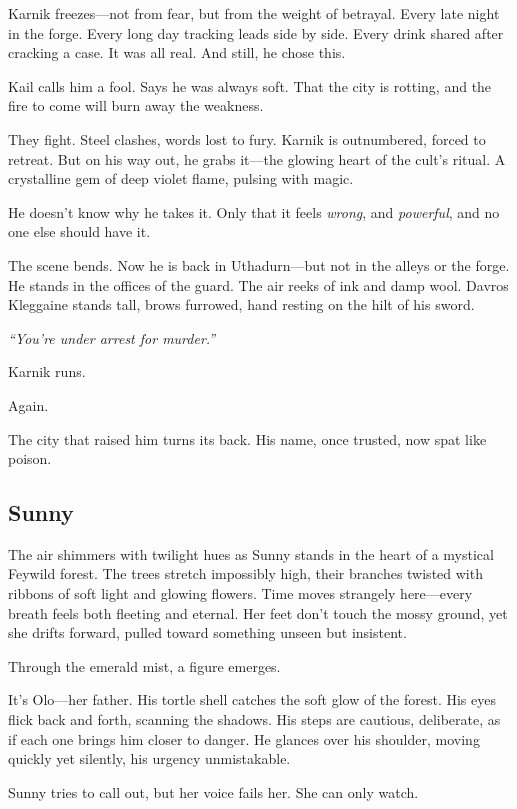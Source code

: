 \documentclass[10pt,a4paper,bg=print,twocolumn,openany,nodeprecatedcode]{dndarticle}
\begin{document}
Karnik freezes—not from fear, but from the weight of betrayal. Every late night in the forge. Every long day tracking leads side by side. Every drink shared after cracking a case. It was all real. And still, he chose this.

Kail calls him a fool. Says he was always soft. That the city is rotting, and the fire to come will burn away the weakness.

They fight. Steel clashes, words lost to fury. Karnik is outnumbered, forced to retreat. But on his way out, he grabs it—the glowing heart of the cult’s ritual. A crystalline gem of deep violet flame, pulsing with magic.  

He doesn’t know why he takes it. Only that it feels \textit{wrong}, and \textit{powerful}, and no one else should have it.

The scene bends. Now he is back in Uthadurn—but not in the alleys or the forge. He stands in the offices of the guard. The air reeks of ink and damp wool. Davros Kleggaine stands tall, brows furrowed, hand resting on the hilt of his sword.

\textit{“You’re under arrest for murder.”}

Karnik runs.

Again.

The city that raised him turns its back. His name, once trusted, now spat like poison.

\subsection*{Sunny}


The air shimmers with twilight hues as Sunny stands in the heart of a mystical Feywild forest. The trees stretch impossibly high, their branches twisted with ribbons of soft light and glowing flowers. Time moves strangely here—every breath feels both fleeting and eternal. Her feet don’t touch the mossy ground, yet she drifts forward, pulled toward something unseen but insistent.

Through the emerald mist, a figure emerges.

It’s Olo—her father. His tortle shell catches the soft glow of the forest. His eyes flick back and forth, scanning the shadows. His steps are cautious, deliberate, as if each one brings him closer to danger. He glances over his shoulder, moving quickly yet silently, his urgency unmistakable.

Sunny tries to call out, but her voice fails her. She can only watch.
\end{document}
